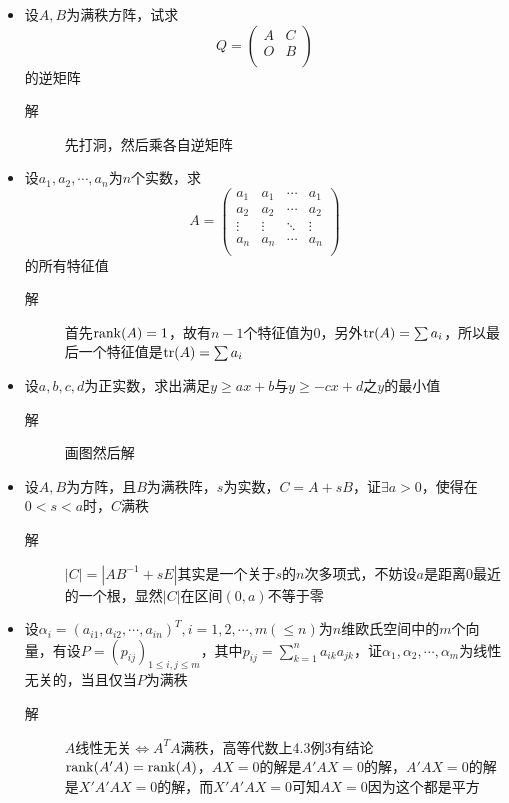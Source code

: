 \begin{itemize}

\item 设$A,B$为满秩方阵，试求
\[
Q=\left(
\begin{array}{cc}
A & C\\
O & B \\
\end{array}
\right)
\]
的逆矩阵
\begin{description}
\item[解] 先打洞，然后乘各自逆矩阵
\end{description}

\item 设$a_1,a_2,\cdots,a_n$为$n$个实数，求
\[
A=\left(
\begin{array}{cccc}
a_1 & a_1 & \cdots & a_1 \\
a_2 & a_2 & \cdots & a_2 \\
\vdots & \vdots & \ddots & \vdots\\
a_n & a_n & \cdots & a_n \\
\end{array}
\right)
\]
的所有特征值
\begin{description}
\item[解] 首先$\operatorname{rank}(A)=1$，故有$n-1$个特征值为0，另外$\operatorname{tr}(A)=\sum a_i$，所以最后一个特征值是$\operatorname{tr}(A)=\sum a_i$
\end{description}

\item 设$a,b,c,d$为正实数，求出满足$y \geq ax+b$与$y\geq -cx+d$之$y$的最小值
\begin{description}
\item[解] 画图然后解
\end{description}

\item 设$A,B$为方阵，且$B$为满秩阵，$s$为实数，$C=A+sB$，证$\exists a>0$，使得在$0<s<a$时，$C$满秩
\begin{description}
\item[解] $|C|=|AB^{-1}+sE|$其实是一个关于$s$的$n$次多项式，不妨设$a$是距离0最近的一个根，显然$|C|$在区间$(0,a)$不等于零
\end{description}

\item 设$\alpha_i=(a_{i1},a_{i2},\cdots,a_{in})^T,i=1,2,\cdots,m(\leq n)$为$n$维欧氏空间中的$m$个向量，有设$P=(p_{ij})_{1\leq i,j\leq m}$，其中$p_{ij}=\sum_{k=1}^n a_{ik}a_{jk}$，证$\alpha_1,\alpha_2,\cdots,\alpha_m$为线性无关的，当且仅当$P$为满秩
\begin{description}
\item[解] $A$线性无关$\Leftrightarrow A^TA$满秩，高等代数上4.3例3有结论$\operatorname{rank}(A'A)=\operatorname{rank}(A)$，$AX=0$的解是$A'AX=0$的解，$A'AX=0$的解是$X'A'AX=0$的解，而$X'A'AX=0$可知$AX=0$因为这个都是平方
\end{description}


\end{itemize}

